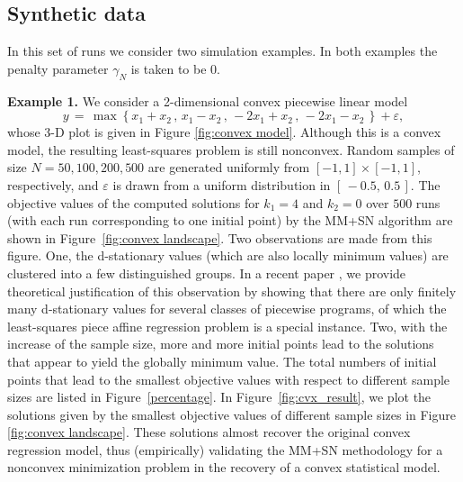 \documentclass{siamart}
\begin{document}
\subsection{Synthetic data} In this set of runs we consider two simulation examples. In both examples the penalty parameter $\gamma_N$ is taken to be 0.

\noindent
{\bf Example 1.}  We consider a 2-dimensional convex piecewise linear
model $$
y \, = \, \max\left\{
x_1 + x_2\,,\,
x_1 - x_2\,,\,
-2x_1 + x_2\,,\,
-2x_1 - x_2\,\right\} + \varepsilon,
$$
whose 3-D plot is given in Figure \ref{fig:convex model}. Although this is a convex model, the resulting least-squares problem is still nonconvex.
Random samples of size $N =50, 100, 200, 500$ are generated uniformly from $[-1,1]\times [-1,1]$, respectively, and $\varepsilon$ is drawn from
a uniform distribution in $[ \, -0.5,\, 0.5 \,]$.  The objective values of the computed solutions for $k_1=4$ and $k_2=0$ over $500$ runs
(with each run corresponding to one initial point) by the MM+SN algorithm are shown in Figure~\ref{fig:convex landscape}.
Two observations are made from this figure.  One, the d-stationary values (which are also locally minimum values) are clustered into a
few distinguished groups.  In a recent paper \cite{CuiPang18}, we provide theoretical justification of  this observation by showing
that there are only finitely many d-stationary values for several classes of piecewise programs, of which the least-squares piece affine
regression problem is a special instance.  Two, with the increase of the sample size, more and more initial points lead to the solutions
that appear to yield the globally minimum value.  The total numbers of initial points that lead to the smallest objective
values with respect to different sample sizes are listed in Figure~\ref{percentage}.  In Figure~\ref{fig:cvx_result}, we plot
the solutions given by the smallest objective values of different sample sizes in Figure \ref{fig:convex landscape}.
These solutions almost recover the  original convex regression model, thus (empirically) validating the MM+SN methodology for a nonconvex
minimization problem in the recovery of a convex statistical model.
\end{document}
